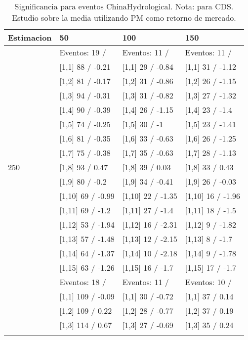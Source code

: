 \begin{table}

\caption{Significancia para eventos ChinaHydrological. Nota: para CDS. Estudio sobre la media utilizando PM como retorno de mercado.}
\centering
\begin{tabular}[t]{llll}
\toprule
Estimacion & 50 & 100 & 150\\
\midrule
 & Eventos:  19 / & Eventos:  11 / & Eventos:  11 /\\
 & {}[1,1] 88  / -0.21 & {}[1,1] 29  / -0.84 & {}[1,1] 31  / -1.12\\
 & {}[1,2] 81  / -0.17 & {}[1,2] 31  / -0.86 & {}[1,2] 26  / -1.15\\
 & {}[1,3] 94  / -0.31 & {}[1,3] 31  / -0.82 & {}[1,3] 27  / -1.32\\
 & {}[1,4] 90  / -0.39 & {}[1,4] 26  / -1.15 & {}[1,4] 23  / -1.4\\
\addlinespace
 & {}[1,5] 74  / -0.25 & {}[1,5] 30  / -1 & {}[1,5] 23  / -1.41\\
 & {}[1,6] 81  / -0.35 & {}[1,6] 33  / -0.63 & {}[1,6] 26  / -1.25\\
 & {}[1,7] 75  / -0.38 & {}[1,7] 35  / -0.63 & {}[1,7] 28  / -1.13\\
250 & {}[1,8] 93  / 0.47 & {}[1,8] 39  / 0.03 & {}[1,8] 33  / 0.43\\
 & {}[1,9] 80  / -0.2 & {}[1,9] 34  / -0.41 & {}[1,9] 26  / -0.03\\
\addlinespace
 & {}[1,10] 69  / -0.99 & {}[1,10] 22  / -1.35 & {}[1,10] 16  / -1.96\\
 & {}[1,11] 69  / -1.2 & {}[1,11] 27  / -1.4 & {}[1,11] 18  / -1.5\\
 & {}[1,12] 53  / -1.94 & {}[1,12] 16  / -2.31 & {}[1,12] 9  / -1.82\\
 & {}[1,13] 57  / -1.48 & {}[1,13] 12  / -2.15 & {}[1,13] 8  / -1.7\\
 & {}[1,14] 64  / -1.37 & {}[1,14] 10  / -2.18 & {}[1,14] 9  / -1.78\\
\addlinespace
 & {}[1,15] 63  / -1.26 & {}[1,15] 16  / -1.7 & {}[1,15] 17  / -1.7\\
 & Eventos:  18 / & Eventos:  11 / & Eventos:  10 /\\
 & {}[1,1] 109  / -0.09 & {}[1,1] 30  / -0.72 & {}[1,1] 37  / 0.14\\
 & {}[1,2] 109  / 0.22 & {}[1,2] 28  / -0.77 & {}[1,2] 37  / 0.19\\
 & {}[1,3] 114  / 0.67 & {}[1,3] 27  / -0.69 & {}[1,3] 35  / 0.24\\
\addlinespace

\end{tabular}
\end{table}
